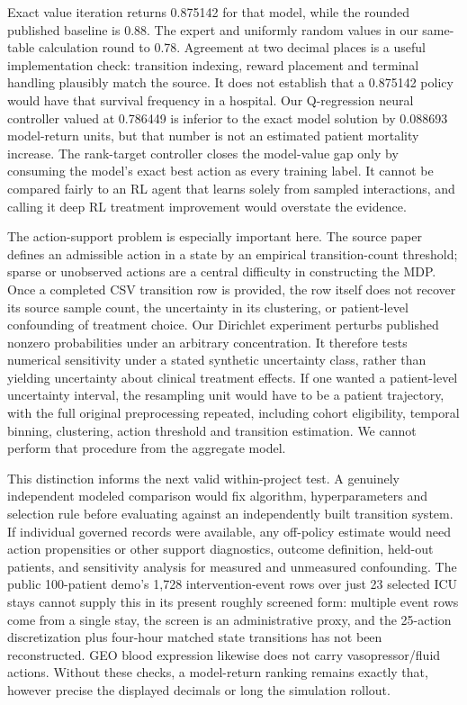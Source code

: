 Exact value iteration returns 0.875142 for that model, while the rounded published baseline is 0.88. The expert and uniformly random values in our same-table calculation round to 0.78. Agreement at two decimal places is a useful implementation check: transition indexing, reward placement and terminal handling plausibly match the source. It does not establish that a 0.875142 policy would have that survival frequency in a hospital. Our Q-regression neural controller valued at 0.786449 is inferior to the exact model solution by 0.088693 model-return units, but that number is not an estimated patient mortality increase. The rank-target controller closes the model-value gap only by consuming the model's exact best action as every training label. It cannot be compared fairly to an RL agent that learns solely from sampled interactions, and calling it deep RL treatment improvement would overstate the evidence.

The action-support problem is especially important here. The source paper defines an admissible action in a state by an empirical transition-count threshold; sparse or unobserved actions are a central difficulty in constructing the MDP. Once a completed CSV transition row is provided, the row itself does not recover its source sample count, the uncertainty in its clustering, or patient-level confounding of treatment choice. Our Dirichlet experiment perturbs published nonzero probabilities under an arbitrary concentration. It therefore tests numerical sensitivity under a stated synthetic uncertainty class, rather than yielding uncertainty about clinical treatment effects. If one wanted a patient-level uncertainty interval, the resampling unit would have to be a patient trajectory, with the full original preprocessing repeated, including cohort eligibility, temporal binning, clustering, action threshold and transition estimation. We cannot perform that procedure from the aggregate model.

This distinction informs the next valid within-project test. A genuinely independent modeled comparison would fix algorithm, hyperparameters and selection rule before evaluating against an independently built transition system. If individual governed records were available, any off-policy estimate would need action propensities or other support diagnostics, outcome definition, held-out patients, and sensitivity analysis for measured and unmeasured confounding. The public 100-patient demo's 1,728 intervention-event rows over just 23 selected ICU stays cannot supply this in its present roughly screened form: multiple event rows come from a single stay, the screen is an administrative proxy, and the 25-action discretization plus four-hour matched state transitions has not been reconstructed. GEO blood expression likewise does not carry vasopressor/fluid actions. Without these checks, a model-return ranking remains exactly that, however precise the displayed decimals or long the simulation rollout.

